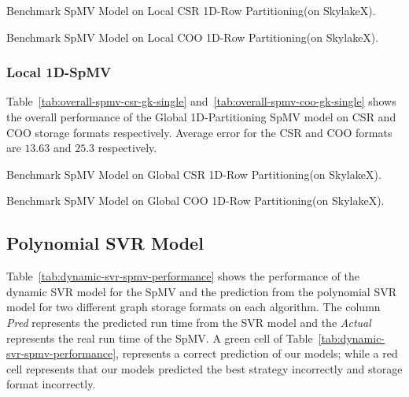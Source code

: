 \documentclass[sigconf,review,anonymous]{acmart}
\begin{document}
\begin{table}[htb]
\caption{Benchmark SpMV Model on Local CSR 1D-Row Partitioning(on SkylakeX).}
\label{tab:overall-spmv-csr-lk-single}
\let\center\empty
\let\endcenter\relax
\centering
\resizebox{.8\width}{!}{}
\end{table}

\begin{table}[htb]
\caption{Benchmark SpMV Model on Local COO 1D-Row Partitioning(on SkylakeX).}
\label{tab:overall-spmv-coo-lk-single}
\let\center\empty
\let\endcenter\relax
\centering
\resizebox{.8\width}{!}{}
\end{table}


\subsubsection{Local 1D-SpMV}
Table~\ref{tab:overall-spmv-csr-gk-single} and~\ref{tab:overall-spmv-coo-gk-single} shows the overall performance of the Global 1D-Partitioning 
SpMV model on CSR and COO storage formats respectively.  Average error for the CSR and COO formats are 
$13.63$ and $25.3$ respectively. 

\begin{table}[htb]
\caption{Benchmark SpMV Model on Global CSR 1D-Row Partitioning(on SkylakeX).}
\label{tab:overall-spmv-csr-gk-single}
\let\center\empty
\let\endcenter\relax
\centering
\resizebox{.8\width}{!}{}
\end{table}

\begin{table}[htb]
\caption{Benchmark SpMV Model on Global COO 1D-Row Partitioning(on SkylakeX).}
\label{tab:overall-spmv-coo-gk-single}
\let\center\empty
\let\endcenter\relax
\centering
\resizebox{.8\width}{!}{}
\end{table}

\subsection{Polynomial SVR Model}
Table~\ref{tab:dynamic-svr-spmv-performance} shows the performance of the dynamic SVR model for the SpMV 
and the prediction from the polynomial SVR model for two different
graph storage formats on each algorithm. The column \textit{Pred}
represents the predicted run time from the SVR model and the
\textit{Actual} represents the real run time of the SpMV. A green cell of  
Table~\ref{tab:dynamic-svr-spmv-performance}, represents a correct prediction of our
models; while a red cell represents that our models predicted the best
strategy incorrectly and storage format incorrectly. 
\end{document}
